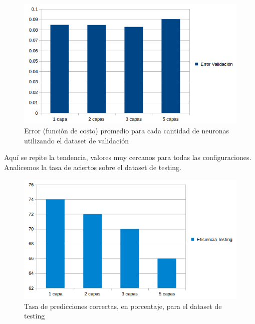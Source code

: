 \begin{figure}[h]
  \begin{center}
  \includegraphics[scale=0.75]{graficos/ej2_cant_capas_error_valid.png}
  \caption{Error (función de costo) promedio para cada cantidad de neuronas utilizando el dataset de validación}
  \end{center}
\end{figure}

\newpage

Aquí se repite la tendencia, valores muy cercanos para todas las configuraciones.\\

Analicemos la tasa de aciertos sobre el dataset de testing.

\begin{figure}[h]
  \begin{center}
  \includegraphics[scale=0.75]{graficos/ej2_cant_capas_testing.png}
  \caption{Tasa de predicciones correctas, en porcentaje, para el dataset de testing}
  \end{center}
\end{figure}

